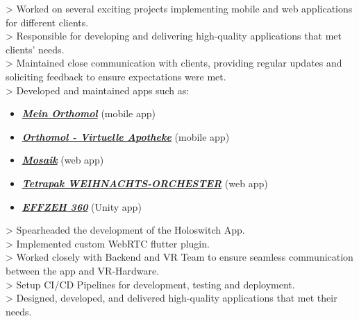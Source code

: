 \documentclass[10pt,a4paper,normalphoto]{altacv}
\begin{document}
\begin{fullwidth}
> Worked on several exciting projects implementing mobile and web applications for different clients.\\
> Responsible for developing and delivering high-quality applications that met clients' needs.\\
> Maintained close communication with clients, providing regular updates and soliciting feedback to ensure expectations were met.\\
\vspace{1em}
> Developed and maintained apps such as:
\vspace{.5em}
\begin{itemize}
    \item \href{https://bit.ly/3tEGnTf}{\textit{\textbf{Mein Orthomol}}} (mobile app)
    \item \href{https://bit.ly/3DfgH2S}{\textit{\textbf{Orthomol - Virtuelle Apotheke}}} (mobile app)
    \item \href{https://tetra-pak-mosaik.web.app/}{\textit{\textbf{Mosaik}}} (web app)
    \item \href{https://tetrapak-dabf7.web.app/}{\textit{\textbf{Tetrapak WEIHNACHTS-ORCHESTER}}} (web app)
    \item \href{https://bit.ly/3DcJzJ5}{\textit{\textbf{EFFZEH 360}}} (Unity app)
\end{itemize}

\vspace{1em}


\newpage


> Spearheaded the development of the Holoswitch App.\\
> Implemented custom WebRTC flutter plugin.\\
> Worked closely with Backend and VR Team to ensure seamless communication between the app and VR-Hardware.\\
> Setup CI/CD Pipelines for development, testing and deployment.\\
> Designed, developed, and delivered high-quality applications that met their needs.


\end{fullwidth}
\end{document}
